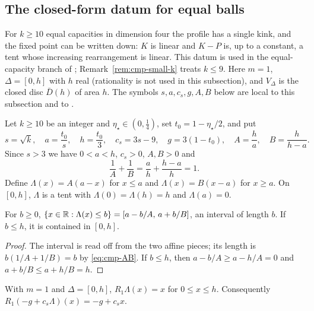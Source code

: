 \subsection{The closed-form datum for equal balls}\label{sec:cmp-linear}

For $k\ge10$ equal capacities in dimension four the profile has a single kink, and the fixed point can be written
down: $K$ is linear and $K-P$ is, up to a constant, a tent whose increasing rearrangement is linear. This datum is
used in the equal-capacity branch of ; Remark~\ref{rem:cmp-small-k} treats $k\le9$. Here
$m=1$, $\Delta=[0,h]$ with $h$ real (rationality is not used in this subsection), and $V_\Delta$ is the closed disc
$\bar D(h)$ of area $h$. The symbols $s,a,c_s,g,A,B$ below are local to this subsection and to
.

Let $k\ge10$ be an integer and $\eta_\star\in(0,\frac14)$, set $t_0=1-\eta_\star/2$, and put
\[
 s=\sqrt k,\quad a=\frac{t_0}s,\quad h=\frac{t_0}3,\quad c_s=3s-9,\quad g=3(1-t_0),\quad A=\frac ha,\quad B=\frac h{h-a}.
\]
Since $s>3$ we have $0<a<h$, $c_s>0$, $A,B>0$ and
\begin{equation}\label{eq:cmp-AB}
 \frac1A+\frac1B=\frac ah+\frac{h-a}h=1 .
\end{equation}
Define $\Lambda(x)=A(a-x)$ for $x\le a$ and $\Lambda(x)=B(x-a)$ for $x\ge a$. On $[0,h]$, $\Lambda$ is a tent with
$\Lambda(0)=\Lambda(h)=h$ and $\Lambda(a)=0$.

\begin{lemma}\label{lem:cmp-tent-sublevel}
For $b\ge0$, $\{x\in\mathbb{R}:\Lambda(x)\le b\}=[a-b/A,\,a+b/B]$, an interval of length $b$. If $b\le h$, it is
contained in $[0,h]$.
\end{lemma}

\begin{proof}
The interval is read off from the two affine pieces; its length is $b(1/A+1/B)=b$ by \eqref{eq:cmp-AB}. If $b\le h$,
then $a-b/A\ge a-h/A=0$ and $a+b/B\le a+h/B=h$.
\end{proof}

\begin{corollary}\label{thm:cmp-tent-rearrangement}
With $m=1$ and $\Delta=[0,h]$, $R_1\Lambda(x)=x$ for $0\le x\le h$. Consequently
$R_1(-g+c_s\Lambda)(x)=-g+c_sx$.
\end{corollary}

